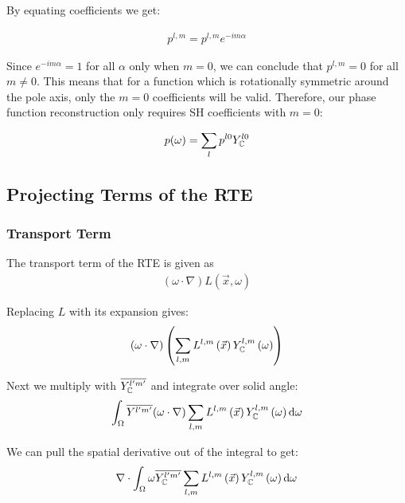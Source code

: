 \documentclass[10pt]{scrartcl}
\begin{document}
By equating coefficients we get:

\begin{align*}
p^{l,m} = p^{l,m}e^{-i m\alpha}
\end{align*}

Since $e^{-i m\alpha}=1$ for all $\alpha$ only when $m=0$, we can conclude that $p^{l,m} = 0$ for all $m\ne0$. This means that for a function which is rotationally symmetric around the pole axis, only the $m=0$ coefficients will be valid. Therefore, our phase function reconstruction only requires SH coefficients with $m=0$:

\begin{align}
\label{eq:sh_exp_phase}
p(\omega) =
\sum_l
{
p^{l0}
Y_{\mathbb{C}}^{l0}
}
\end{align}
%
 


\subsection{Projecting Terms of the RTE}

\subsubsection{Transport Term}
\label{sec:complex_transport_term}

The transport term of the RTE is given as
\begin{align*}
(\omega\cdot\nabla)L(\vec{x}, \omega)
\end{align*}

Replacing $L$ with its expansion gives:
\begin{align*}
\left(\omega\cdot\nabla\right)
\left(
\sum_{l,m}
{
L^{l,m}\left(\vec{x}\right )
Y_{\mathbb{C}}^{l,m}\left(\omega\right)
}
\right)
\end{align*}

Next we multiply with $\overline{Y_{\mathbb{C}}^{l'm'}}$ and integrate over solid angle:
\begin{align*}
\int_\Omega
{
\overline{Y^{l'm'}}(\omega\cdot\nabla)
\sum_{l,m}
{
L^{l,m}\left(\vec{x}\right)
Y_{\mathbb{C}}^{l,m}\left(\omega\right)
}
}
\,\mathrm{d}\omega
\end{align*}



We can pull the spatial derivative out of the integral to get:
\begin{align}
\nabla\cdot\int_\Omega
{
\omega\overline{Y_{\mathbb{C}}^{l'm'}}
\sum_{l,m}
{
L^{l,m}\left(\vec{x}\right)
Y_{\mathbb{C}}^{l,m}\left(\omega\right)
}
\,\mathrm{d}\omega
}
\label{eq:complex_transport_a}
\end{align}
\end{document}

